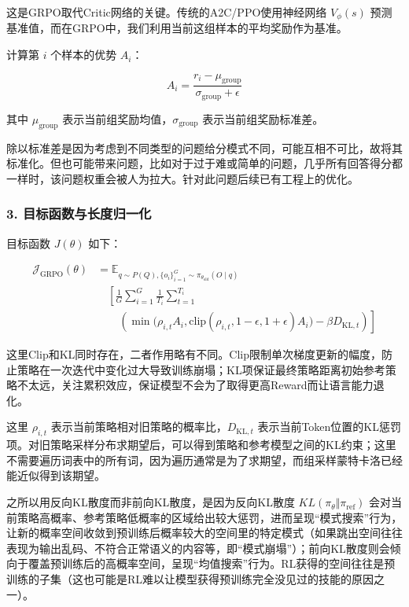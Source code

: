 这是GRPO取代Critic网络的关键。传统的A2C/PPO使用神经网络 \(V_{\phi}(s)\) 预测基准值，而在GRPO中，我们利用当前这组样本的平均奖励作为基准。

计算第 \(i\) 个样本的优势 \(A_i\)：

\[
A_i=\frac{r_i-\mu_{\mathrm{group}}}{\sigma_{\mathrm{group}}+\epsilon}
\]

其中 \(\mu_{\mathrm{group}}\) 表示当前组奖励均值，\(\sigma_{\mathrm{group}}\) 表示当前组奖励标准差。

除以标准差是因为考虑到不同类型的问题给分模式不同，可能互相不可比，故将其标准化。但也可能带来问题，比如对于过于难或简单的问题，几乎所有回答得分都一样时，该问题权重会被人为拉大。针对此问题后续已有工程上的优化。

\hypertarget{ux76eeux6807ux51fdux6570ux4e0eux957fux5ea6ux5f52ux4e00ux5316}{%
\subsubsection{3. 目标函数与长度归一化}\label{ux76eeux6807ux51fdux6570ux4e0eux957fux5ea6ux5f52ux4e00ux5316}}

目标函数 \(J(\theta)\) 如下：

\[
\begin{aligned}
\mathcal{J}_{\mathrm{GRPO}}(\theta)
&=\mathbb{E}_{q\sim P(Q),\{o_i\}_{i=1}^{G}\sim\pi_{\theta_{\mathrm{old}}}(O\mid q)} \\
&\quad \left[
\frac{1}{G}\sum_{i=1}^{G}\frac{1}{T_i}\sum_{t=1}^{T_i}
\right. \\
&\qquad \left.
\left(
\min\!\bigl(\rho_{i,t}A_i,\mathrm{clip}(\rho_{i,t},1-\epsilon,1+\epsilon)A_i\bigr)
-\beta D_{\mathrm{KL},t}
\right)
\right]
\end{aligned}
\]

这里Clip和KL同时存在，二者作用略有不同。Clip限制单次梯度更新的幅度，防止策略在一次迭代中变化过大导致训练崩塌；KL项保证最终策略距离初始参考策略不太远，关注累积效应，保证模型不会为了取得更高Reward而让语言能力退化。

这里 \(\rho_{i,t}\) 表示当前策略相对旧策略的概率比，\(D_{\mathrm{KL},t}\) 表示当前Token位置的KL惩罚项。对旧策略采样分布求期望后，可以得到策略和参考模型之间的KL约束；这里不需要遍历词表中的所有词，因为遍历通常是为了求期望，而组采样蒙特卡洛已经能近似得到该期望。

之所以用反向KL散度而非前向KL散度，是因为反向KL散度 \(KL(\pi_{\theta}\Vert\pi_{\mathrm{ref}})\) 会对当前策略高概率、参考策略低概率的区域给出较大惩罚，进而呈现``模式搜索''行为，让新的概率空间收敛到预训练后概率较大的空间里的特定模式（如果跳出空间往往表现为输出乱码、不符合正常语义的内容等，即``模式崩塌''）；前向KL散度则会倾向于覆盖预训练后的高概率空间，呈现``均值搜索''行为。RL获得的空间往往是预训练的子集（这也可能是RL难以让模型获得预训练完全没见过的技能的原因之一）。

